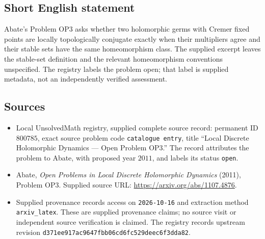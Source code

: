 \documentclass[11pt]{article}
\begin{document}
\subsection{Short English statement}
Abate's Problem OP3 asks whether two holomorphic germs with Cremer fixed points are locally topologically conjugate exactly when their multipliers agree and their stable sets have the same homeomorphism class. The supplied excerpt leaves the stable-set definition and the relevant homeomorphism conventions unspecified. The registry labels the problem open; that label is supplied metadata, not an independently verified assessment.
\subsection{Sources}
\begin{itemize}
\item Local UnsolvedMath registry, supplied complete source record: permanent ID \(800785\), exact source problem code \texttt{catalogue entry}, title ``Local Discrete Holomorphic Dynamics --- Open Problem OP3.'' The record attributes the problem to Abate, with proposed year \(2011\), and labels its status \texttt{open}.
\item Abate, \emph{Open Problems in Local Discrete Holomorphic Dynamics} (2011), Problem OP3. Supplied source URL: \url{https://arxiv.org/abs/1107.4876}.
\item Supplied provenance records access on \texttt{2026-10-16} and extraction method \texttt{arxiv\_latex}. These are supplied provenance claims; no source visit or independent source verification is claimed. The registry records upstream revision \texttt{d371ee917ac9647fbb06cd6fc529deec6f3dda82}.
\end{itemize}
\end{document}

